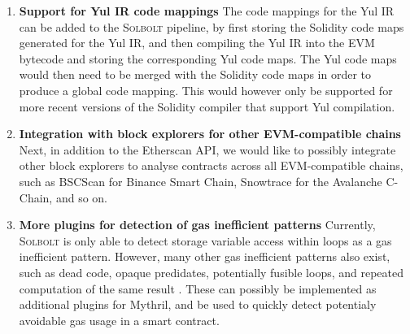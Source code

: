 \begin{enumerate}
  \item \textbf{Support for Yul IR code mappings} The code mappings for the Yul IR can be added to the
  \textcolor{NavyBlue}{\textsc{Solbolt}} pipeline, by first storing the Solidity code maps generated for the Yul IR, and then compiling
  the Yul IR into the EVM bytecode and storing the corresponding Yul code maps. The Yul code maps would then
  need to be merged with the Solidity code maps in order to produce a global code mapping. This would however
  only be supported for more recent versions of the Solidity compiler that support Yul compilation.
    
  \item \textbf{Integration with block explorers for other EVM-compatible chains} Next, in addition to 
  the Etherscan API, we would like to possibly integrate other block explorers
  to analyse contracts across all EVM-compatible chains, such as BSCScan for Binance Smart Chain,
  Snowtrace for the Avalanche C-Chain, and so on.

  \item \textbf{More plugins for detection of gas inefficient patterns} Currently, \textcolor{NavyBlue}{\textsc{Solbolt}} is only able to
  detect storage variable access within loops as a gas inefficient pattern. However, many other gas inefficient
  patterns also exist, such as dead code, opaque predidates, potentially fusible loops, and repeated
  computation of the same result \cite{gaschecker} \cite{designpatternsforgasoptimisation}. These can
  possibly be implemented as additional plugins for Mythril, and be used to quickly detect potentialy avoidable
  gas usage in a smart contract.

\end{enumerate}